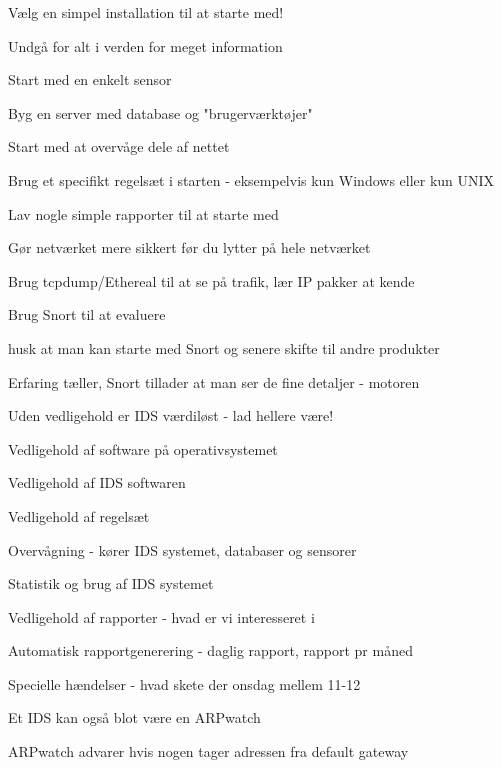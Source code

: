 \documentclass[Screen16to9,17pt]{foils}
\begin{document}

\begin{list1}
\item Vælg en simpel installation til at starte med!
\item Undgå for alt i verden for meget information
\begin{list2}
\item Start med en enkelt sensor
\item Byg en server med database og "brugerværktøjer"
\item Start med at overvåge dele af nettet
\item Brug et specifikt regelsæt i starten - eksempelvis kun Windows eller kun UNIX
\item Lav nogle simple rapporter til at starte med
\end{list2}
\item Gør netværket mere sikkert før du lytter på hele netværket
\item Brug tcpdump/Ethereal til at se på trafik, lær IP pakker at
  kende
\item Brug Snort til at evaluere
\begin{list2}
\item husk at man kan starte med Snort og senere skifte til andre
produkter
\item Erfaring tæller, Snort tillader at man ser de fine detaljer - motoren
\end{list2}
\end{list1}


\begin{list1}
\item Uden vedligehold er IDS værdiløst - lad hellere være!
\begin{list2}
\item Vedligehold af software på operativsystemet
\item Vedligehold af IDS softwaren
\item Vedligehold af regelsæt
\end{list2}
\item Overvågning - kører IDS systemet, databaser og sensorer
\item Statistik og brug af IDS systemet
\begin{list2}
\item Vedligehold af rapporter - hvad er vi interesseret i
\item Automatisk rapportgenerering - daglig rapport, rapport pr måned
\item Specielle hændelser - hvad skete der onsdag mellem 11-12
\end{list2}
\item Et IDS kan også blot være en ARPwatch
\item ARPwatch advarer hvis nogen tager adressen fra default gateway
\end{list1}
\end{document}
